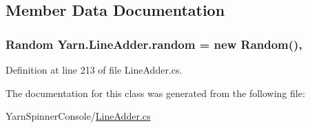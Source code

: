 \subsection{Member Data Documentation}
\hypertarget{a00130_ad887744b1b813fc081be814958742c37}{
\subsubsection[{random}]{\setlength{\rightskip}{0pt plus 5cm}Random Yarn.\-Line\-Adder.\-random = new Random()\hspace{0.3cm}{\ttfamily [static]}, {\ttfamily [private]}}}\label{a00130_ad887744b1b813fc081be814958742c37}


Definition at line 213 of file Line\-Adder.\-cs.



The documentation for this class was generated from the following file\-:\begin{DoxyCompactItemize}
\item 
Yarn\-Spinner\-Console/\hyperlink{a00324}{Line\-Adder.\-cs}\end{DoxyCompactItemize}
